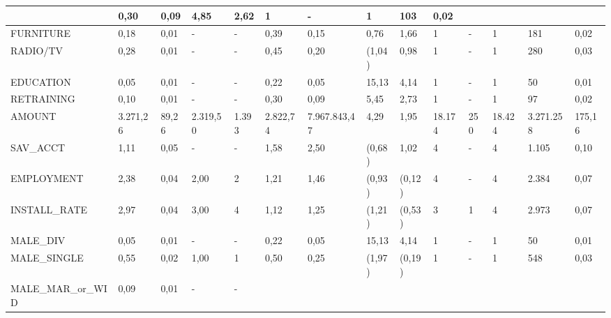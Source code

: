 \begin{table}[]
\begin{tabular}{|p{2.6cm}|p{0.75cm}|p{0.6cm}|p{0.75cm}|p{0.6cm}|p{0.75cm}|p{1.2cm}|p{0.6cm}|p{0.65cm}|p{0.7cm}|p{0.45cm}|p{0.65cm}|p{0.85cm}|p{0.55cm}|}
		&{\tiny 0,30}&{\tiny 0,09}&{\tiny 4,85}&{\tiny 2,62}
		&{\tiny 1}&{\tiny -}&{\tiny 1}&{\tiny 103}&{\tiny 0,02}\\ \hline
		{\tiny FURNITURE}
		&{\tiny 0,18}&{\tiny 0,01}&{\tiny -}&{\tiny -}
		&{\tiny 0,39}&{\tiny 0,15}&{\tiny 0,76}&{\tiny 1,66}
		&{\tiny 1}&{\tiny -}&{\tiny 1}&{\tiny 181}&{\tiny 0,02}\\ \hline
		{\tiny RADIO/TV}
		&{\tiny 0,28}&{\tiny 0,01}&{\tiny -}&{\tiny -}
		&{\tiny 0,45}&{\tiny 0,20}&{\tiny (1,04)}&{\tiny 0,98}
		&{\tiny 1}&{\tiny -}&{\tiny 1}&{\tiny 280}&{\tiny 0,03}\\ \hline
		{\tiny EDUCATION}
		&{\tiny 0,05}&{\tiny 0,01}&{\tiny -}&{\tiny -}
		&{\tiny 0,22}&{\tiny 0,05}&{\tiny 15,13}&{\tiny 4,14}
		&{\tiny 1}&{\tiny -}&{\tiny 1}&{\tiny 50}&{\tiny 0,01}\\ \hline
		{\tiny RETRAINING}
		&{\tiny 0,10}&{\tiny 0,01}&{\tiny -}&{\tiny -}
		&{\tiny 0,30}&{\tiny 0,09}&{\tiny 5,45}&{\tiny 2,73}
		&{\tiny 1}&{\tiny -}&{\tiny 1}&{\tiny 97}&{\tiny 0,02}\\ \hline
		{\tiny AMOUNT}
		&{\tiny  3.271,26}&{\tiny 89,26}&{\tiny 2.319,50}&{\tiny 1.393}
		&{\tiny 2.822,74}&{\tiny 7.967.843,47}&{\tiny 4,29}&{\tiny 1,95}
		&{\tiny 18.174}&{\tiny 250}&{\tiny 18.424}&{\tiny 3.271.258}&{\tiny 175,16}\\ \hline
		{\tiny SAV\_ACCT}
		&{\tiny 1,11}&{\tiny 0,05}&{\tiny -}&{\tiny -}
		&{\tiny 1,58}&{\tiny 2,50}&{\tiny (0,68)}&{\tiny 1,02}
		&{\tiny 4}&{\tiny -}&{\tiny 4}&{\tiny 1.105}&{\tiny 0,10}\\ \hline
		{\tiny EMPLOYMENT}
		&{\tiny 2,38}&{\tiny 0,04}&{\tiny 2,00}&{\tiny 2}
		&{\tiny 1,21}&{\tiny 1,46}&{\tiny (0,93)}&{\tiny (0,12)}
		&{\tiny 4}&{\tiny -}&{\tiny 4}&{\tiny 2.384}&{\tiny 0,07 }\\ \hline
		{\tiny INSTALL\_RATE}
		&{\tiny 2,97}&{\tiny 0,04}&{\tiny 3,00}&{\tiny 4}
		&{\tiny 1,12}&{\tiny 1,25}&{\tiny (1,21)}&{\tiny (0,53)}
		&{\tiny 3}&{\tiny 1}&{\tiny 4}&{\tiny 2.973}&{\tiny 0,07}\\ \hline
		{\tiny MALE\_DIV}
		&{\tiny 0,05}&{\tiny 0,01}&{\tiny -}&{\tiny -}
		&{\tiny 0,22}&{\tiny 0,05}&{\tiny 15,13}&{\tiny 4,14}
		&{\tiny 1}&{\tiny -}&{\tiny 1}&{\tiny 50}&{\tiny 0,01}\\ \hline
		{\tiny MALE\_SINGLE}
		&{\tiny 0,55}&{\tiny 0,02}&{\tiny 1,00}&{\tiny 1}
		&{\tiny 0,50}&{\tiny 0,25}&{\tiny (1,97)}&{\tiny (0,19)}
		&{\tiny 1}&{\tiny -}&{\tiny 1}&{\tiny 548}&{\tiny 0,03}\\ \hline
	    {\tiny 	MALE\_MAR\_or\_WID}
	    &{\tiny 0,09}&{\tiny 0,01}&{\tiny -}&{\tiny -}

\end{tabular}
\end{table}
